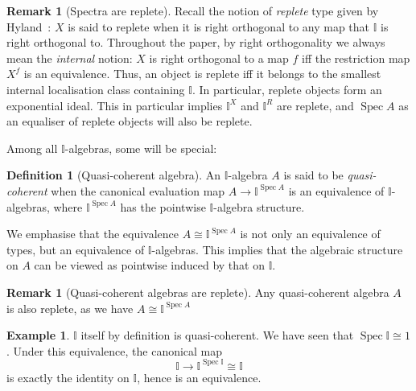 \documentclass[a4paper,12pt]{amsart}
\theoremstyle{definition}
\newtheorem{example}[theorem]{Example}
\newtheorem{definition}[theorem]{Definition}
\newtheorem{remark}[theorem]{Remark}
\newcommand{\mb}[1]{\mathbf{#1}}
\newcommand{\mbb}[1]{\mathbb{#1}}
\newcommand{\I}{\mbb I}
\newcommand{\alg}{\text{-}\mb{Alg}}
\newcommand{\spec}{\operatorname{Spec}}
\begin{document}
\begin{remark}[Spectra are replete]\label{rem:specarereplete}
  Recall the notion of \emph{replete} type given by Hyland~\cite{hyland1990first}: $X$ is said to replete when it is right orthogonal to any map that $\I$ is right orthogonal to. Throughout the paper, by right orthogonality we always mean the \emph{internal} notion: $X$ is right orthogonal to a map $f$ iff the restriction map $X^f$ is an equivalence. Thus, an object is replete iff it belongs to the smallest internal localisation class containing $\I$. In particular, replete objects form an exponential ideal. This in particular implies $\I^X$ and $\I^R$ are replete, and $\spec A$ as an equaliser of replete objects will also be replete.
\end{remark}

Among all $\I$-algebras, some will be special:

\begin{definition}[Quasi-coherent algebra]
  An $\I$-algebra $A$ is said to be \emph{quasi-coherent} when the canonical evaluation map $A \to \I^{\spec A}$ is an equivalence of $\I$-algebras, where $\I^{\spec A}$ has the pointwise $\I$-algebra structure.
\end{definition}

We emphasise that the equivalence $A \cong \I^{\spec A}$ is not only an equivalence of types, but an equivalence of $\I$-algebras. This implies that the algebraic structure on $A$ can be viewed as pointwise induced by that on $\I$. 

\begin{remark}[Quasi-coherent algebras are replete]\label{rem:qcreplete}
  Any quasi-coherent algebra $A$ is also replete, as we have $A\cong \I^{\spec{A}}$
\end{remark}

\begin{example}\label{exm:intervalqc}
  $\I$ itself by definition is quasi-coherent. We have seen that $\spec \I \cong 1$. Under this equivalence, the canonical map 
  \[ \I \to \I^{\spec \I} \cong \I \]
  is exactly the identity on $\I$, hence is an equivalence.
\end{example}
\end{document}
